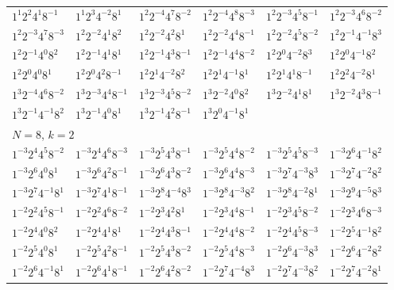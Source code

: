 \documentclass[12pt]{amsart}
\numberwithin{equation}{section}
\theoremstyle{plain}
\theoremstyle{definition}
\theoremstyle{remark}
\begin{document}
\begin{longtable}{llllll}
$1^{1}2^{2}4^{1}8^{-1}$ & $1^{1}2^{3}4^{-2}8^{1}$ & $1^{2}2^{-4}4^{7}8^{-2}$ & $1^{2}2^{-4}4^{8}8^{-3}$ & $1^{2}2^{-3}4^{5}8^{-1}$ & $1^{2}2^{-3}4^{6}8^{-2}$\\
$1^{2}2^{-3}4^{7}8^{-3}$ & $1^{2}2^{-2}4^{1}8^{2}$ & $1^{2}2^{-2}4^{2}8^{1}$ & $1^{2}2^{-2}4^{4}8^{-1}$ & $1^{2}2^{-2}4^{5}8^{-2}$ & $1^{2}2^{-1}4^{-1}8^{3}$\\
$1^{2}2^{-1}4^{0}8^{2}$ & $1^{2}2^{-1}4^{1}8^{1}$ & $1^{2}2^{-1}4^{3}8^{-1}$ & $1^{2}2^{-1}4^{4}8^{-2}$ & $1^{2}2^{0}4^{-2}8^{3}$ & $1^{2}2^{0}4^{-1}8^{2}$\\
$1^{2}2^{0}4^{0}8^{1}$ & $1^{2}2^{0}4^{2}8^{-1}$ & $1^{2}2^{1}4^{-2}8^{2}$ & $1^{2}2^{1}4^{-1}8^{1}$ & $1^{2}2^{1}4^{1}8^{-1}$ & $1^{2}2^{2}4^{-2}8^{1}$\\
$1^{3}2^{-4}4^{6}8^{-2}$ & $1^{3}2^{-3}4^{4}8^{-1}$ & $1^{3}2^{-3}4^{5}8^{-2}$ & $1^{3}2^{-2}4^{0}8^{2}$ & $1^{3}2^{-2}4^{1}8^{1}$ & $1^{3}2^{-2}4^{3}8^{-1}$\\
$1^{3}2^{-1}4^{-1}8^{2}$ & $1^{3}2^{-1}4^{0}8^{1}$ & $1^{3}2^{-1}4^{2}8^{-1}$ & $1^{3}2^{0}4^{-1}8^{1}$ & &\\
\midrule
\multicolumn{6}{l}{$N=8$, $k=2$}\\
$1^{-3}2^{4}4^{5}8^{-2}$ & $1^{-3}2^{4}4^{6}8^{-3}$ & $1^{-3}2^{5}4^{3}8^{-1}$ & $1^{-3}2^{5}4^{4}8^{-2}$ & $1^{-3}2^{5}4^{5}8^{-3}$ & $1^{-3}2^{6}4^{-1}8^{2}$\\
$1^{-3}2^{6}4^{0}8^{1}$ & $1^{-3}2^{6}4^{2}8^{-1}$ & $1^{-3}2^{6}4^{3}8^{-2}$ & $1^{-3}2^{6}4^{4}8^{-3}$ & $1^{-3}2^{7}4^{-3}8^{3}$ & $1^{-3}2^{7}4^{-2}8^{2}$\\
$1^{-3}2^{7}4^{-1}8^{1}$ & $1^{-3}2^{7}4^{1}8^{-1}$ & $1^{-3}2^{8}4^{-4}8^{3}$ & $1^{-3}2^{8}4^{-3}8^{2}$ & $1^{-3}2^{8}4^{-2}8^{1}$ & $1^{-3}2^{9}4^{-5}8^{3}$\\
$1^{-2}2^{2}4^{5}8^{-1}$ & $1^{-2}2^{2}4^{6}8^{-2}$ & $1^{-2}2^{3}4^{2}8^{1}$ & $1^{-2}2^{3}4^{4}8^{-1}$ & $1^{-2}2^{3}4^{5}8^{-2}$ & $1^{-2}2^{3}4^{6}8^{-3}$\\
$1^{-2}2^{4}4^{0}8^{2}$ & $1^{-2}2^{4}4^{1}8^{1}$ & $1^{-2}2^{4}4^{3}8^{-1}$ & $1^{-2}2^{4}4^{4}8^{-2}$ & $1^{-2}2^{4}4^{5}8^{-3}$ & $1^{-2}2^{5}4^{-1}8^{2}$\\
$1^{-2}2^{5}4^{0}8^{1}$ & $1^{-2}2^{5}4^{2}8^{-1}$ & $1^{-2}2^{5}4^{3}8^{-2}$ & $1^{-2}2^{5}4^{4}8^{-3}$ & $1^{-2}2^{6}4^{-3}8^{3}$ & $1^{-2}2^{6}4^{-2}8^{2}$\\
$1^{-2}2^{6}4^{-1}8^{1}$ & $1^{-2}2^{6}4^{1}8^{-1}$ & $1^{-2}2^{6}4^{2}8^{-2}$ & $1^{-2}2^{7}4^{-4}8^{3}$ & $1^{-2}2^{7}4^{-3}8^{2}$ & $1^{-2}2^{7}4^{-2}8^{1}$\\

\end{longtable}
\end{document}
